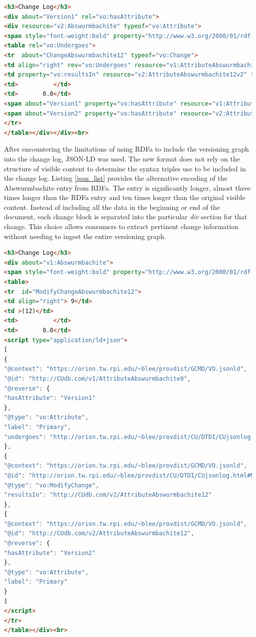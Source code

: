 \begin{lstlisting}[language=HTML, caption=Abswurmbachite RDFa, label=rdfa_list]
<h3>Change Log</h3>
<div about="Version1" rel="vo:hasAttribute">
<div resource="v2:Abswurmbachite" typeof="vo:Attribute">
<span style="font-weight:bold" property="http://www.w3.org/2000/01/rdf-schema#label">Abswurmbachite</span>
<table rel="vo:Undergoes">
<tr  about="ChangeAbswurmbachite12" typeof="vo:Change">
<td align="right" rev="vo:Undergoes" resource="v1:AttributeAbswurmbachite12v1" typeof="vo:Attribute"> 9</td>
<td property="vo:resultsIn" resource="v2:AttributeAbswurmbachite12v2" typeof="vo:Attribute">(12)</td>
<td>          </td>
<td>       0.0</td>
<span about="Version1" property="vo:hasAttribute" resource="v1:AttributeAbswurmbachite12v1"></span>
<span about="Version2" property="vo:hasAttribute" resource="v2:AttributeAbswurmbachite12v2"></span>
</tr>
</table></div></div><br>
\end{lstlisting}

After encountering the limitations of using RDFa to include the versioning graph into the change log, JSON-LD was used.
The new format does not rely on the structure of visible content to determine the syntax triples use to be included in the change log.
Listing \ref{json_list} provides the alternative encoding of the Abswurmbachite entry from RDFa.
The entry is significantly longer, almost three times longer than the RDFa entry and ten times longer than the original visible content.
Instead of including all the data in the beginning or end of the document, each change block is separated into the particular \textit{div} section for that change.
This choice allows consumers to extract pertinent change information without needing to ingest the entire versioning graph.

\begin{lstlisting}[language=HTML, caption=Abswurmbachite JSON-LD, label=json_list]
<h3>Change Log</h3>
<div about="v1:Abswurmbachite">
<span style="font-weight:bold" property="http://www.w3.org/2000/01/rdf-schema#label">Abswurmbachite</span>
<table>
<tr  id="ModifyChangeAbswurmbachite12">
<td align="right"> 9</td>
<td >(12)</td>
<td>          </td>
<td>       0.0</td>
<script type="application/ld+json">
[
{
"@context": "https://orion.tw.rpi.edu/~blee/provdist/GCMD/VO.jsonld", 
"@id": "http://CUdb.com/v1/AttributeAbswurmbachite9", 
"@reverse": {
"hasAttribute": "Version1"
}, 
"@type": "vo:Attribute", 
"label": "Primary", 
"undergoes": "http://orion.tw.rpi.edu/~blee/provdist/CU/DTDI/CUjsonlog.html#ModifyChangeAbswurmbachite12"
}, 
{
"@context": "https://orion.tw.rpi.edu/~blee/provdist/GCMD/VO.jsonld", 
"@id": "http://orion.tw.rpi.edu/~blee/provdist/CU/DTDI/CUjsonlog.html#ModifyChangeAbswurmbachite12", 
"@type": "vo:ModifyChange", 
"resultsIn": "http://CUdb.com/v2/AttributeAbswurmbachite12"
}, 
{
"@context": "https://orion.tw.rpi.edu/~blee/provdist/GCMD/VO.jsonld", 
"@id": "http://CUdb.com/v2/AttributeAbswurmbachite12", 
"@reverse": {
"hasAttribute": "Version2"
}, 
"@type": "vo:Attribute", 
"label": "Primary"
}
]
</script>
</tr>
</table></div><br>
\end{lstlisting}

